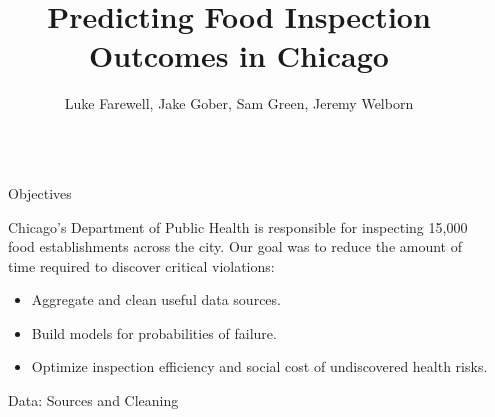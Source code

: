 \documentclass[final]{beamer}
\title{Predicting Food Inspection Outcomes in Chicago} %
\author{Luke Farewell, Jake Gober, Sam Green, Jeremy Welborn} %
\institute{Computer Science 109a / Statistics 121a, Harvard University} %
\newlength{\sepwid}
\newlength{\onecolwid}
\begin{document}

\setlength{\belowcaptionskip}{2ex} %
\setlength\belowdisplayshortskip{2ex} %

\begin{frame}[t] %

\begin{columns}[t] %

\begin{column}{\sepwid}\end{column} %

\begin{column}{\onecolwid} %


\begin{alertblock}{Objectives}

Chicago's Department of Public Health is responsible for 
inspecting 15,000 food establishments across the city. 
Our goal was to reduce the amount of time required to 
discover critical violations: 

\begin{itemize}
\item Aggregate and clean useful data sources.
\item Build models for probabilities of failure.
\item Optimize inspection efficiency and social
cost of undiscovered health risks.
\end{itemize}

\end{alertblock}


\begin{block}{Data: Sources and Cleaning}


\end{block}
\end{column}
\end{columns}
\end{frame}
\end{document}
